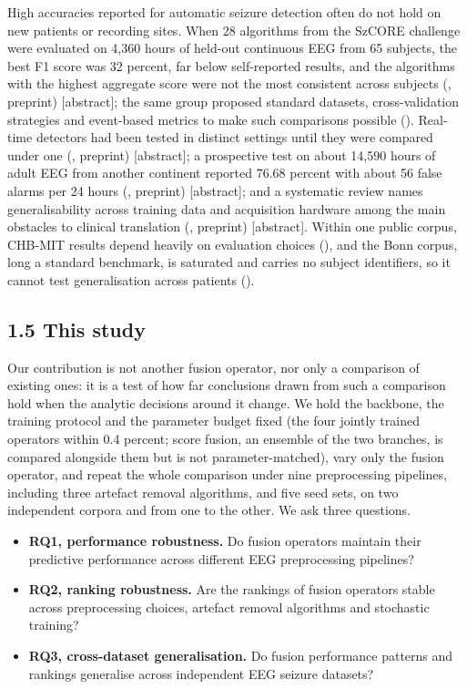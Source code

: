 \documentclass[11pt,a4paper]{article}
\providecommand{\tightlist}{%
  \setlength{\itemsep}{0pt}\setlength{\parskip}{0pt}}
\begin{document}
High accuracies reported for automatic seizure detection often do not hold on new
patients or recording sites. When 28 algorithms from the SzCORE challenge were evaluated
on 4,360 hours of held-out continuous EEG from 65 subjects, the best F1 score was 32
percent, far below self-reported results, and the algorithms with the highest aggregate
score were not the most consistent across subjects (\citealp{Dan2025arxiv}, preprint)
{[}abstract{]}; the same group proposed standard datasets, cross-validation strategies and
event-based metrics to make such comparisons possible (\citealp{Dan_2024}). Real-time
detectors had been tested in distinct settings until they were compared under one (\citealp{Lee2022arxiv}, preprint) {[}abstract{]}; a prospective test on about 14,590 hours of adult EEG
from another continent reported 76.68 percent with about 56 false alarms per 24 hours
(\citealp{Yang2021arxiv}, preprint) {[}abstract{]}; and a systematic review names generalisability
across training data and acquisition hardware among the main obstacles to clinical
translation (\citealp{Moutonnet2024arxiv}, preprint) {[}abstract{]}. Within one public corpus, CHB-MIT
results depend heavily on evaluation choices (\citealp{Ali_2024}), and the Bonn corpus,
long a standard benchmark, is saturated and carries no subject identifiers, so it cannot
test generalisation across patients (\citealp{Kontras_2026}).

\subsection{1.5 This study}\label{this-study}

Our contribution is not another fusion operator, nor only a comparison of existing
ones: it is a test of how far conclusions drawn from such a comparison hold when the
analytic decisions around it change. We hold the backbone, the training protocol and the
parameter budget fixed (the four jointly trained operators within 0.4 percent; score
fusion, an ensemble of the two branches, is compared alongside them but is not
parameter-matched), vary only the fusion operator, and repeat
the whole comparison under nine preprocessing pipelines, including three artefact
removal algorithms, and five seed sets, on two independent corpora and from one to the
other. We ask three questions.

\begin{itemize}
\tightlist
\item
  \textbf{RQ1, performance robustness.} Do fusion operators maintain their predictive
  performance across different EEG preprocessing pipelines?
\item
  \textbf{RQ2, ranking robustness.} Are the rankings of fusion operators stable across
  preprocessing choices, artefact removal algorithms and stochastic training?
\item
  \textbf{RQ3, cross-dataset generalisation.} Do fusion performance patterns and rankings
  generalise across independent EEG seizure datasets?
\end{itemize}
\end{document}

